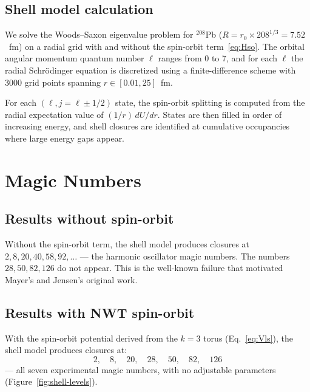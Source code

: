 \documentclass[11pt,a4paper]{article}
\begin{document}
\subsection{Shell model calculation}

We solve the Woods--Saxon eigenvalue problem for ${}^{208}$Pb
($R = r_0 \times 208^{1/3} = 7.52$~fm) on a radial grid with and without
the spin-orbit term~\eqref{eq:Hso}.  The orbital angular momentum quantum
number $\ell$ ranges from 0 to 7, and for each $\ell$ the radial
Schr\"odinger equation is discretized using a finite-difference scheme with
3000 grid points spanning $r \in [0.01, 25]$~fm.

For each $(\ell, j = \ell \pm 1/2)$ state, the spin-orbit splitting is
computed from the radial expectation value of $(1/r)\,dU/dr$.  States are
then filled in order of increasing energy, and shell closures are identified
at cumulative occupancies where large energy gaps appear.


\section{Magic Numbers}
\label{sec:magic}

\subsection{Results without spin-orbit}

Without the spin-orbit term, the shell model produces closures at
$2, 8, 20, 40, 58, 92, \ldots$ --- the harmonic oscillator magic numbers.
The numbers $28, 50, 82, 126$ do not appear.  This is the well-known failure
that motivated Mayer's and Jensen's original work.

\subsection{Results with NWT spin-orbit}

With the spin-orbit potential derived from the $k=3$ torus (Eq.~\ref{eq:Vls}),
the shell model produces closures at:
\begin{equation}
  \boxed{2,\quad 8,\quad 20,\quad 28,\quad 50,\quad 82,\quad 126}
  \label{eq:magic}
\end{equation}
--- all seven experimental magic numbers, with no adjustable parameters
(Figure~\ref{fig:shell-levels}).
\end{document}
